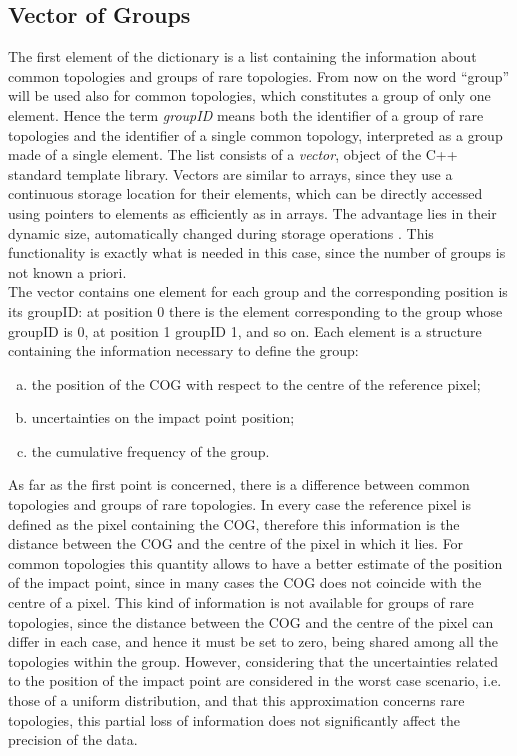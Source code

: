 \subsection{Vector of Groups}
The first element of the dictionary is a list containing the information about common topologies and groups of rare topologies. From now on the word ``group'' will be used also for common topologies, which constitutes a group of only one element. Hence the term \textit{groupID} means both the identifier of a group of rare topologies and the identifier of a single common topology, interpreted as a group made of a single element. The list consists of a \textit{vector}, object of the C++ standard template library. Vectors are similar to arrays, since they use a continuous storage location for their elements, which can be directly accessed using pointers to elements as efficiently as in arrays. The advantage lies in their dynamic size, automatically changed during storage operations \cite{vector}. This functionality is exactly what is needed in this case, since the number of groups is not known a priori.\\
The vector contains one element for each group and the corresponding position is its groupID: at position 0 there is the element corresponding to the group whose groupID is 0, at position 1 groupID 1, and so on. Each element is a structure containing the information necessary to define the group:
\begin{enumerate}[a)]
 \item the position of the COG with respect to the centre of the reference pixel;
 \item uncertainties on the impact point position;
 \item the cumulative frequency of the group.
\end{enumerate}
As far as the first point is concerned, there is a difference between common topologies and groups of rare topologies. In every case the reference pixel is defined as the pixel containing the COG, therefore this information is the distance between the COG and the centre of the pixel in which it lies. For common topologies this quantity allows to have a better estimate of the position of the impact point, since in many cases the COG does not coincide with the centre of a pixel. This kind of information is not available for groups of rare topologies, since the distance between the COG and the centre of the pixel can differ in each case, and hence it must be set to zero, being shared among all the topologies within the group. However, considering that the uncertainties related to the position of the impact point are considered in the worst case scenario, i.e. those of a uniform distribution, and that this approximation concerns rare topologies, this partial loss of information does not significantly affect the precision of the data.\\
